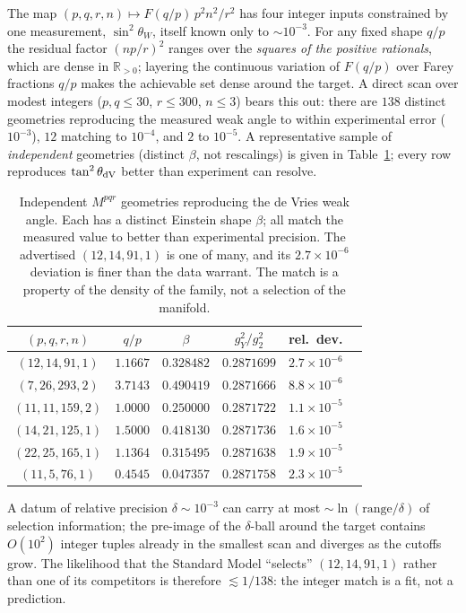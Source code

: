 \documentclass[11pt]{article}
\theoremstyle{plain}
\theoremstyle{definition}
\newcommand{\sinsq}{\sin^{2}\theta_W}
\newcommand{\R}{\mathbb{R}}
\begin{document}
The map $(p,q,r,n)\mapsto F(q/p)\,p^2n^2/r^2$ has four integer inputs
constrained by one measurement, $\sinsq$, itself known only to $\sim10^{-3}$.
For any fixed shape $q/p$ the residual factor $(np/r)^2$ ranges over the
\emph{squares of the positive rationals}, which are dense in $\R_{>0}$; layering
the continuous variation of $F(q/p)$ over Farey fractions $q/p$ makes the
achievable set dense around the target. A direct scan over modest integers
($p,q\le30$, $r\le300$, $n\le3$) bears this out: there are $138$ distinct
geometries reproducing the measured weak angle to within experimental error
($10^{-3}$), $12$ matching to $10^{-4}$, and $2$ to $10^{-5}$. A representative
sample of \emph{independent} geometries (distinct $\beta$, not rescalings) is
given in Table~\ref{tab:overdet}; every row reproduces $\tan^2\theta_{\rm dV}$
better than experiment can resolve.
\begin{table}[h]
\centering
\begin{tabular}{cccccc}
\toprule
$(p,q,r,n)$ & $q/p$ & $\beta$ & $g_Y^2/g_2^2$ & rel.\ dev.\\
\midrule
$(12,14,91,1)$ & $1.1667$ & $0.328482$ & $0.2871699$ & $2.7\times10^{-6}$\\
$(7,26,293,2)$ & $3.7143$ & $0.490419$ & $0.2871666$ & $8.8\times10^{-6}$\\
$(11,11,159,2)$ & $1.0000$ & $0.250000$ & $0.2871722$ & $1.1\times10^{-5}$\\
$(14,21,125,1)$ & $1.5000$ & $0.418130$ & $0.2871736$ & $1.6\times10^{-5}$\\
$(22,25,165,1)$ & $1.1364$ & $0.315495$ & $0.2871638$ & $1.9\times10^{-5}$\\
$(11,5,76,1)$ & $0.4545$ & $0.047357$ & $0.2871758$ & $2.3\times10^{-5}$\\
\bottomrule
\end{tabular}
\caption{Independent $M^{pqr}$ geometries reproducing the de Vries weak angle.
Each has a distinct Einstein shape $\beta$; all match the measured value to
better than experimental precision. The advertised $(12,14,91,1)$ is one of
many, and its $2.7\times10^{-6}$ deviation is finer than the data warrant. The
match is a property of the density of the family, not a selection of the
manifold.}
\label{tab:overdet}
\end{table}

A datum of relative precision $\delta\sim10^{-3}$ can carry at most
$\sim\ln(\text{range}/\delta)$ of selection information; the pre-image of the
$\delta$-ball around the target contains $O(10^2)$ integer tuples already in
the smallest scan and diverges as the cutoffs grow. The likelihood that the
Standard Model ``selects'' $(12,14,91,1)$ rather than one of its competitors
is therefore $\lesssim1/138$: the integer match is a fit, not a prediction.
\end{document}
